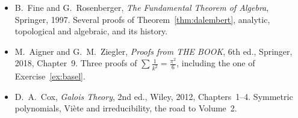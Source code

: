 \begin{itemize}
\item B.~Fine and G.~Rosenberger, \emph{The Fundamental Theorem of Algebra}, Springer, 1997. Several proofs of Theorem~\ref{thm:dalembert}, analytic, topological and algebraic, and its history.
\item M.~Aigner and G.~M.~Ziegler, \emph{Proofs from THE BOOK}, 6th ed., Springer, 2018, Chapter~9. Three proofs of $\sum\frac1{k^2}=\frac{\pi^2}6$, including the one of Exercise~\ref{ex:basel}.
\item D.~A.~Cox, \emph{Galois Theory}, 2nd ed., Wiley, 2012, Chapters~1--4. Symmetric polynomials, Vi\`ete and irreducibility, the road to Volume~2.
\end{itemize}
